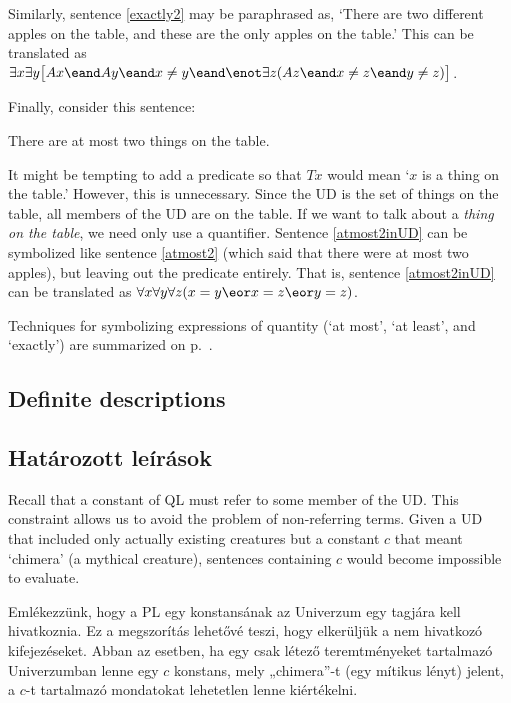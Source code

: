 Similarly, sentence \ref{exactly2} may be paraphrased as, `There are two different apples on the table, and these are the only apples on the table.' This can be translated as $\exists x\exists y\bigl[Ax \eand Ay \eand x\neq y \eand \enot\exists z(Az \eand x\neq z \eand y\neq z)\bigr]$.

Finally, consider this sentence:
\begin{earg}
\item[\ex{atmost2inUD}] There are at most two things on the table.
\end{earg}
It might be tempting to add a predicate so that $Tx$ would mean `$x$ is a thing on the table.' However, this is unnecessary. Since the UD is the set of things on the table, all members of the UD are on the table. If we want to talk about a \emph{thing on the table}, we need only use a quantifier. Sentence \ref{atmost2inUD} can be symbolized like sentence \ref{atmost2} (which said that there were at most two apples), but leaving out the predicate entirely. That is, sentence \ref{atmost2inUD} can be translated as $\forall x \forall y \forall z(x=y \eor x=z \eor y=z)$.

Techniques for symbolizing expressions of quantity (`at most', `at least', and `exactly') are summarized on p.~\pageref{summary.atleast}.



\subsection*{Definite descriptions}
\subsection{Határozott leírások}

\label{subsec.defdesc}
Recall that a constant of QL must refer to some member of the UD. This constraint allows us to avoid the problem of non-referring terms. Given a UD that included only actually existing creatures but a constant $c$ that meant `chimera' (a mythical creature), sentences containing $c$ would become impossible to evaluate.

Emlékezzünk, hogy a PL egy konstansának az Univerzum egy tagjára kell hivatkoznia. Ez a megszorítás lehetővé teszi, hogy elkerüljük a nem hivatkozó kifejezéseket. Abban az esetben, ha egy csak létező teremtményeket tartalmazó Univerzumban lenne egy $c$ konstans, mely „chimera”-t (egy mítikus lényt) jelent, a $c$-t tartalmazó mondatokat lehetetlen lenne kiértékelni.

